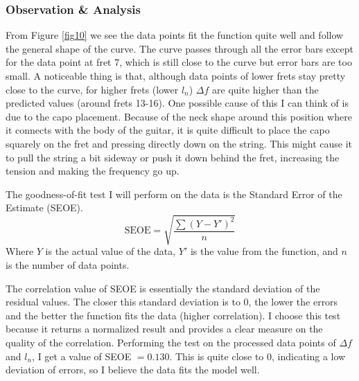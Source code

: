 \documentclass[11pt]{article}
\begin{document}
\begin{flushleft}
            \subsubsection*{Observation \& Analysis}
                From Figure \ref{fig10} we see the data points fit the function quite well and follow the general shape of the curve. The curve passes through all the error bars except for the data point at fret 7, which is still close to the curve but error bars are too small. A noticeable thing is that, although data points of lower frets stay pretty close to the curve, for higher frets (lower $l_n$) $\Delta f$ are quite higher than the predicted values (around frets 13-16). One possible cause of this I can think of is due to the capo placement. Because of the neck shape around this position where it connects with the body of the guitar, it is quite difficult to place the capo squarely on the fret and pressing directly down on the string. This might cause it to pull the string a bit sideway or push it down behind the fret, increasing the tension and making the frequency go up. \par
                The goodness-of-fit test I will perform on the data is the Standard Error of the Estimate (SEOE). 
                \begin{equation*}
                    \text{SEOE} = \sqrt{\frac{\sum{(Y-Y')^2}}{n}}
                \end{equation*}
                Where $Y$ is the actual value of the data, $Y'$ is the value from the function, and $n$ is the number of data points. \cite{lane} \par
                The correlation value of SEOE is essentially the standard deviation of the residual values. The closer this standard deviation is to 0, the lower the errors and the better the function fits the data (higher correlation). I choose this test because it returns a normalized result and provides a clear measure on the quality of the correlation. Performing the test on the processed data points of $\Delta f$ and $l_n$, I get a value of SEOE $= 0.130$. This is quite close to 0, indicating a low deviation of errors, so I believe the data fits the model well.
                

\end{flushleft}
\end{document}
